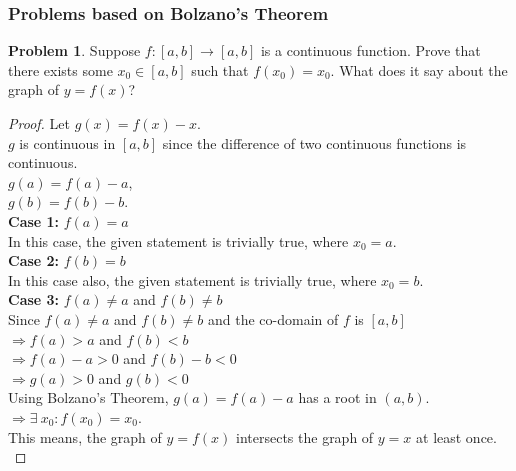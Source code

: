 \documentclass[14]{article}
\theoremstyle{definition}
\newtheorem{prob}{Problem}
\theoremstyle{case}
\begin{document}
\subsubsection{Problems based on Bolzano's Theorem}
\begin{prob}
Suppose $f:[a,b] \to [a,b]$ is a continuous function. Prove that there exists some $x_0 \in [a, b]$ such that $f(x_0) = x_0$. What does it say about the graph of $y = f(x)$?
\begin{proof}
Let $g(x) = f(x) - x$.\\
$g$ is continuous in $[a, b]$ since the difference of two continuous functions is continuous.\\
$g(a) = f(a) - a$,\\
$g(b) = f(b) - b$.\\
\textbf{Case 1:} $f(a) = a$\\
In this case, the given statement is trivially true, where $x_0 = a$.\\
\textbf{Case 2:} $f(b) = b$\\
In this case also, the given statement is trivially true, where $x_0 = b$.\\
\textbf{Case 3:} $f(a) \neq a$ and $f(b) \neq b$\\
Since $f(a) \neq a$ and $f(b) \neq b$ and the co-domain of $f$ is $[a, b]$\\
$\Rightarrow f(a) > a$ and $f(b) < b$\\
$\Rightarrow f(a) - a > 0$ and $f(b) - b < 0$\\
$\Rightarrow g(a) > 0$ and $g(b) < 0$\\
Using Bolzano's Theorem, $g(a) = f(a) - a$ has a root in $(a, b)$.\\
$\Rightarrow \exists\: x_0 : f(x_0) = x_0$.\\
This means, the graph of $y = f(x)$ intersects the graph of $y = x$ at least once.\\
\end{proof}
\end{prob}
\end{document}
